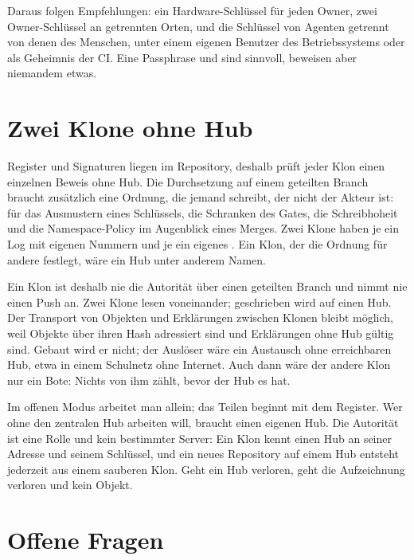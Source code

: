 Daraus folgen Empfehlungen: ein Hardware-Schlüssel für jeden Owner, zwei Owner-Schlüssel an
getrennten Orten, und die Schlüssel von Agenten getrennt von denen des Menschen, unter einem
eigenen Benutzer des Betriebssystems oder als Geheimnis der CI.
Eine Passphrase und  sind sinnvoll, beweisen aber niemandem etwas.

\section[sec:no-peer]{Zwei Klone ohne Hub}

Register und Signaturen liegen im Repository, deshalb prüft jeder Klon einen einzelnen Beweis
ohne Hub.
Die Durchsetzung auf einem geteilten Branch braucht zusätzlich eine Ordnung, die jemand schreibt,
der nicht der Akteur ist: für das Ausmustern eines Schlüssels, die Schranken des Gates, die
Schreibhoheit und die Namespace-Policy im Augenblick eines Merges.
Zwei Klone haben je ein Log mit eigenen Nummern und je ein eigenes .
Ein Klon, der die Ordnung für andere festlegt, wäre ein Hub unter anderem Namen.

Ein Klon ist deshalb nie die Autorität über einen geteilten Branch und nimmt nie einen Push an.
Zwei Klone lesen voneinander; geschrieben wird auf einen Hub.
Der Transport von Objekten und Erklärungen zwischen Klonen bleibt möglich, weil Objekte über
ihren Hash adressiert sind und Erklärungen ohne Hub gültig sind.
Gebaut wird er nicht; der Auslöser wäre ein Austausch ohne erreichbaren Hub, etwa in einem
Schulnetz ohne Internet.
Auch dann wäre der andere Klon nur ein Bote: Nichts von ihm zählt, bevor der Hub es hat.

Im offenen Modus arbeitet man allein; das Teilen beginnt mit dem Register.
Wer ohne den zentralen Hub arbeiten will, braucht einen eigenen Hub.
Die Autorität ist eine Rolle und kein bestimmter Server: Ein Klon kennt einen Hub an seiner
Adresse und seinem Schlüssel, und ein neues Repository auf einem Hub entsteht jederzeit aus einem
sauberen Klon.
Geht ein Hub verloren, geht die Aufzeichnung verloren und kein Objekt.

\section[sec:phase5-open]{Offene Fragen}


